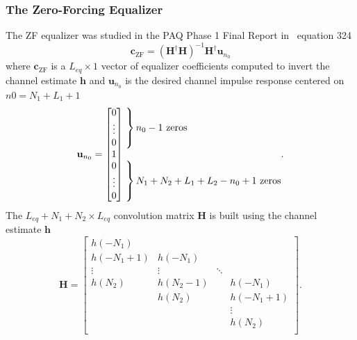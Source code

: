 \subsubsection{The Zero-Forcing Equalizer}
The ZF equalizer was studied in the PAQ Phase 1 Final Report in ~equation 324
\begin{equation}
\mathbf{c}_\text{ZF} = (\mathbf{H}^\dagger \mathbf{H})^{-1} \mathbf{H}^\dagger \mathbf{u}_{n_0}
\label{eq:c_ZF_pinv}
\end{equation}
where $\mathbf{c}_\text{ZF}$ is a $L_{eq} \times 1$ vector of equalizer coefficients computed to invert the channel estimate $\mathbf{h}$
and $\mathbf{u}_{n_0}$ is the desired channel impulse response centered on $n0 = N_1+L_1+1$
\begin{equation}
\mathbf{u}_{n_0} = \begin{bmatrix} 0 \\ \vdots \\ 0 \\ 1 \\ 0 \\ \vdots \\ 0 \end{bmatrix}
	\begin{matrix*}[l] \left. \vphantom{\begin{matrix} 0 \\ \vdots \\ 0 \end{matrix}} \right\}
		\text{$n_0-1$ zeros}
		\\ \\
		\left. \vphantom{\begin{matrix} 0 \\ \vdots \\ 0 \end{matrix}} \right\}
		\text{$N_1+N_2+L_1+L_2-n_0+1$ zeros}
		\end{matrix*}.
		\label{eq:un0_ZF}
\end{equation}
The $L_{eq}+N_1+N_2 \times L_{eq}$ convolution matrix $\mathbf{H}$ is built using the channel estimate $\mathbf{h}$
\begin{equation}
\mathbf{H} = 
		\begin{bmatrix}
		h(-N_1)		&  			& 		 	&  			\\
		h(-N_1+1) 	& h(-N_1)	& 		 	&  			\\
		\vdots	 	& \vdots	& \ddots 	&  			\\
		h(N_2)		& h(N_2-1) 	&  			& h(-N_1)  	\\
		 			& h(N_2) 	&  			& h(-N_1+1) \\
		 			&  	   		&  			& \vdots	\\
		 			&  	   		&  			& h(N_2)	\\
	\end{bmatrix}.
\end{equation}
